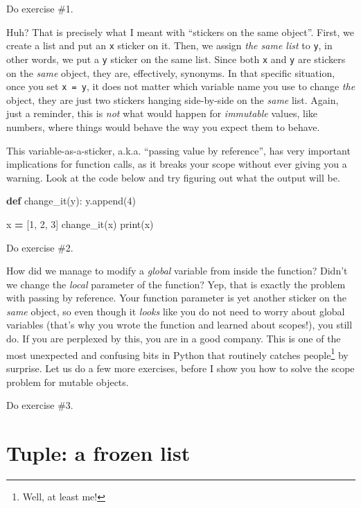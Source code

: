 \documentclass[
]{book}
\newenvironment{Shaded}{\begin{snugshade}}{\end{snugshade}}
\newcommand{\BuiltInTok}[1]{#1}
\newcommand{\DecValTok}[1]{\textcolor[rgb]{0.00,0.00,0.81}{#1}}
\newcommand{\KeywordTok}[1]{\textcolor[rgb]{0.13,0.29,0.53}{\textbf{#1}}}
\newcommand{\NormalTok}[1]{#1}
\newcommand{\OperatorTok}[1]{\textcolor[rgb]{0.81,0.36,0.00}{\textbf{#1}}}
\begin{document}
Do exercise \#1.

Huh? That is precisely what I meant with ``stickers on the same object''. First, we create a list and put an \texttt{x} sticker on it. Then, we assign \emph{the same list} to \texttt{y}, in other words, we put a \texttt{y} sticker on the same list. Since both \texttt{x} and \texttt{y} are stickers on the \emph{same} object, they are, effectively, synonyms. In that specific situation, once you set \texttt{x\ =\ y}, it does not matter which variable name you use to change \emph{the} object, they are just two stickers hanging side-by-side on the \emph{same} list. Again, just a reminder, this is \emph{not} what would happen for \emph{immutable} values, like numbers, where things would behave the way you expect them to behave.

This variable-as-a-sticker, a.k.a. ``passing value by reference'', has very important implications for function calls, as it breaks your scope without ever giving you a warning. Look at the code below and try figuring out what the output will be.

\begin{Shaded}
\begin{Highlighting}[]
\KeywordTok{def}\NormalTok{ change\_it(y):}
\NormalTok{    y.append(}\DecValTok{4}\NormalTok{)}

\NormalTok{x }\OperatorTok{=}\NormalTok{ [}\DecValTok{1}\NormalTok{, }\DecValTok{2}\NormalTok{, }\DecValTok{3}\NormalTok{]}
\NormalTok{change\_it(x)}
\BuiltInTok{print}\NormalTok{(x)}
\end{Highlighting}
\end{Shaded}

Do exercise \#2.

How did we manage to modify a \emph{global} variable from inside the function? Didn't we change the \emph{local} parameter of the function? Yep, that is exactly the problem with passing by reference. Your function parameter is yet another sticker on the \emph{same} object, so even though it \emph{looks} like you do not need to worry about global variables (that's why you wrote the function and learned about scopes!), you still do. If you are perplexed by this, you are in a good company. This is one of the most unexpected and confusing bits in Python that routinely catches people\footnote{Well, at least me!} by surprise. Let us do a few more exercises, before I show you how to solve the scope problem for mutable objects.

Do exercise \#3.

\hypertarget{tuple}{%
\section{Tuple: a frozen list}\label{tuple}}
\end{document}
